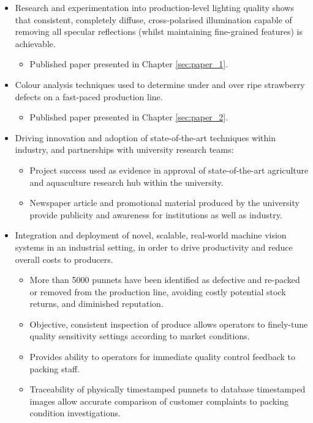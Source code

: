 \documentclass[fleqn,twoside,12pt]{report}
\begin{document}
\begin{itemize}
	\item Research and experimentation into production-level lighting quality shows that consistent, completely diffuse, cross-polarised illumination capable of removing all specular reflections (whilst maintaining fine-grained features) is achievable.
	\begin{itemize}
		\item Published paper presented in Chapter \ref{sec:paper_1}.
	\end{itemize} 
	\item Colour analysis techniques used to determine under and over ripe strawberry defects on a fast-paced production line.
	\begin{itemize}
		\item Published paper presented in Chapter \ref{sec:paper_2}.
	\end{itemize}
	\item Driving innovation and adoption of state-of-the-art techniques within industry, and partnerships with university research teams:
	\begin{itemize}
		\item Project success used as evidence in approval of state-of-the-art agriculture and aquaculture research hub within the university. 
		\item Newspaper article and promotional material produced by the university provide publicity and awareness for institutions as well as industry. 
	\end{itemize}
	\item Integration and deployment of novel, scalable, real-world machine vision systems in an industrial setting, in order to drive productivity and reduce overall costs to producers.
	\begin{itemize}
		\item More than 5000 punnets have been identified as defective and re-packed or removed from the production line, avoiding costly potential stock returns, and diminished reputation.
		\item Objective, consistent inspection of produce allows operators to finely-tune quality sensitivity settings according to market conditions.
		\item Provides ability to operators for immediate quality control feedback to packing staff.
		\item Traceability of physically timestamped punnets to database timestamped images allow accurate comparison of customer complaints to packing condition investigations.  

\end{itemize}
\end{itemize}
\end{document}
